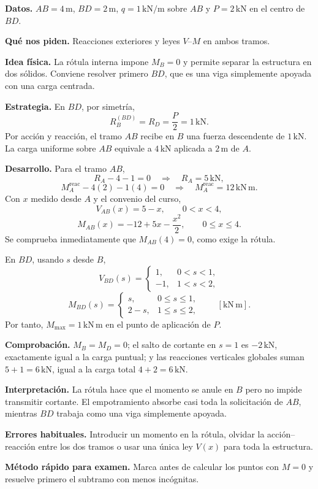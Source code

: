 \begin{solutionbox}
\textbf{Datos.} $AB=4\,\mathrm m$, $BD=2\,\mathrm m$, $q=1\,\mathrm{kN/m}$ sobre $AB$ y $P=2\,\mathrm{kN}$ en el centro de $BD$.\par
\textbf{Qué nos piden.} Reacciones exteriores y leyes $V$--$M$ en ambos tramos.\par
\textbf{Idea física.} La rótula interna impone $M_B=0$ y permite separar la estructura en dos sólidos. Conviene resolver primero $BD$, que es una viga simplemente apoyada con una carga centrada.\par
\textbf{Estrategia.} En $BD$, por simetría,
\[
R_B^{(BD)}=R_D=\frac{P}{2}=1\,\mathrm{kN}.
\]
Por acción y reacción, el tramo $AB$ recibe en $B$ una fuerza descendente de $1\,\mathrm{kN}$. La carga uniforme sobre $AB$ equivale a $4\,\mathrm{kN}$ aplicada a $2\,\mathrm m$ de $A$.\par
\textbf{Desarrollo.} Para el tramo $AB$,
\[
R_A-4-1=0 \quad\Longrightarrow\quad \boxed{R_A=5\,\mathrm{kN}},
\]
\[
M_A^{\mathrm{reac}}-4(2)-1(4)=0
\quad\Longrightarrow\quad
\boxed{M_A^{\mathrm{reac}}=12\,\mathrm{kN\,m}}.
\]
Con $x$ medido desde $A$ y el convenio del curso,
\[
\boxed{V_{AB}(x)=5-x},\qquad 0<x<4,
\]
\[
\boxed{M_{AB}(x)=-12+5x-\frac{x^2}{2}},\qquad 0\le x\le4.
\]
Se comprueba inmediatamente que $M_{AB}(4)=0$, como exige la rótula.\par
En $BD$, usando $s$ desde $B$,
\[
V_{BD}(s)=
\begin{cases}
1, & 0<s<1,\\
-1, & 1<s<2,
\end{cases}
\]
\[
M_{BD}(s)=
\begin{cases}
s, & 0\le s\le1,\\
2-s, & 1\le s\le2,
\end{cases}
\qquad [\mathrm{kN\,m}].
\]
Por tanto, $M_{\max}=1\,\mathrm{kN\,m}$ en el punto de aplicación de $P$.\par
\textbf{Comprobación.} $M_B=M_D=0$; el salto de cortante en $s=1$ es $-2\,\mathrm{kN}$, exactamente igual a la carga puntual; y las reacciones verticales globales suman $5+1=6\,\mathrm{kN}$, igual a la carga total $4+2=6\,\mathrm{kN}$.\par
\textbf{Interpretación.} La rótula hace que el momento se anule en $B$ pero no impide transmitir cortante. El empotramiento absorbe casi toda la solicitación de $AB$, mientras $BD$ trabaja como una viga simplemente apoyada.\par
\textbf{Errores habituales.} Introducir un momento en la rótula, olvidar la acción--reacción entre los dos tramos o usar una única ley $V(x)$ para toda la estructura.\par
\textbf{Método rápido para examen.} Marca antes de calcular los puntos con $M=0$ y resuelve primero el subtramo con menos incógnitas.
\end{solutionbox}

